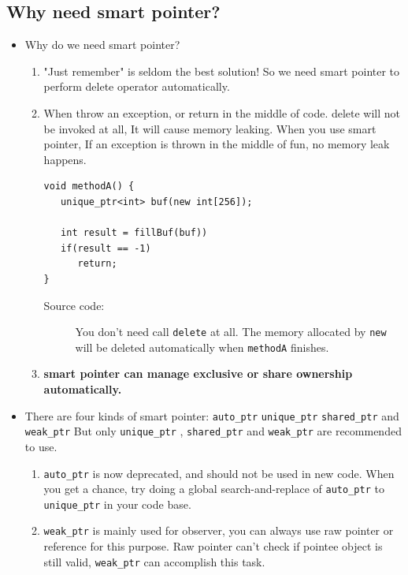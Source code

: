\documentclass[a4paper,11pt,twoside]{book}
\begin{document}
\subsection{Why need smart pointer?}
\begin{itemize}

		\item Why do we need smart pointer?
\begin{enumerate}
		
\item "Just remember" is seldom the best solution! So we need smart pointer to perform delete operator automatically.

\item When throw an exception, or return in the middle of code. delete will not be invoked at all, It will cause memory leaking. When you use smart pointer, If an exception is thrown in the middle of fun, no memory leak happens.
\begin{lstlisting}[numbers=none]
void methodA() {
   unique_ptr<int> buf(new int[256]);

   int result = fillBuf(buf))
   if(result == -1)
      return;
}
\end{lstlisting}
\begin{description}
	\item[Source code:] You don't need call \texttt{delete} at all. The memory allocated by \texttt{new} will be deleted automatically when \texttt{methodA} finishes.
\end{description}

\item \textbf{smart pointer can manage exclusive or share ownership automatically. }
\end{enumerate}

\item There are four kinds of smart pointer: \texttt{auto\_ptr} \texttt{unique\_ptr} \texttt{shared\_ptr} and \texttt{weak\_ptr}  But only \texttt{unique\_ptr} , \texttt{shared\_ptr} and \texttt{weak\_ptr} are recommended to use.
\begin{enumerate}
	\item  \texttt{auto\_ptr} is now deprecated, and should not be used in new code. When you get a chance, try doing a global search-and-replace of \texttt{auto\_ptr} to \texttt{unique\_ptr} in your code base. 
	
	\item \texttt{weak\_ptr} is mainly used for observer, you can always use raw pointer or reference for this purpose. Raw pointer can't check if pointee object is still valid, \texttt{weak\_ptr} can accomplish this task.
\end{enumerate}


\end{itemize}
\end{document}
